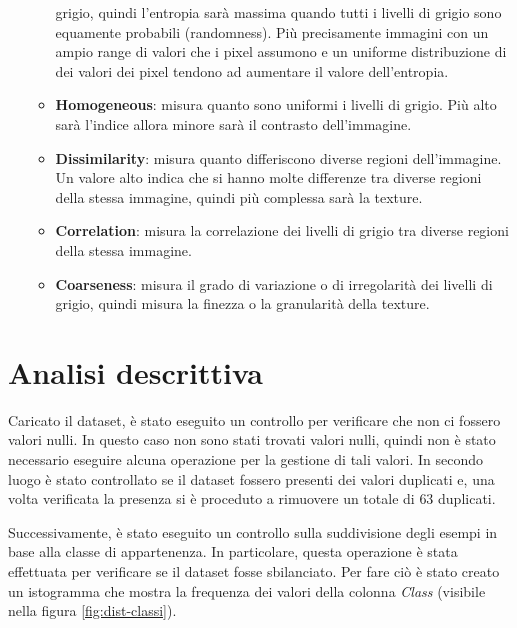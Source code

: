 \begin{enumerate}
\begin{itemize}
                        grigio, quindi l'entropia sarà massima quando tutti i
                        livelli di grigio sono equamente probabili (randomness). Più
                        precisamente immagini con un ampio range di valori che i
                        pixel assumono e un uniforme distribuzione di dei valori 
                        dei pixel tendono ad aumentare il valore dell'entropia.
                  \item \textbf{Homogeneous}: misura quanto sono uniformi i
                        livelli di grigio. Più alto sarà l'indice allora minore
                        sarà il contrasto dell'immagine.
                  \item \textbf{Dissimilarity}: misura quanto differiscono
                        diverse regioni dell'immagine. Un valore alto indica che
                        si hanno molte differenze tra diverse regioni della
                        stessa immagine, quindi più complessa sarà la texture.
                  \item \textbf{Correlation}: misura la correlazione dei livelli
                        di grigio tra diverse regioni della stessa immagine.
                  \item \textbf{Coarseness}: misura il grado di variazione o di
                        irregolarità dei livelli di grigio, quindi misura la
                        finezza o la granularità della texture.
            \end{itemize}
\end{enumerate}
\section{Analisi descrittiva}\label{sec:analisi-descrittiva}
Caricato il dataset, è stato eseguito un controllo per verificare che non ci
fossero valori nulli. In questo caso non sono stati trovati valori nulli, quindi
non è stato necessario eseguire alcuna operazione per la gestione di tali valori.
In secondo luogo è stato controllato se il dataset fossero presenti dei valori
duplicati e, una volta verificata la presenza si è proceduto a rimuovere un
totale di $63$ duplicati.

Successivamente, è stato eseguito un controllo sulla suddivisione degli esempi
in base alla classe di appartenenza. In particolare, questa operazione è stata
effettuata per verificare se il dataset fosse sbilanciato. Per fare ciò è stato
creato un istogramma che mostra la frequenza dei valori della colonna
\textit{Class} (visibile nella figura \ref{fig:dist-classi}).

